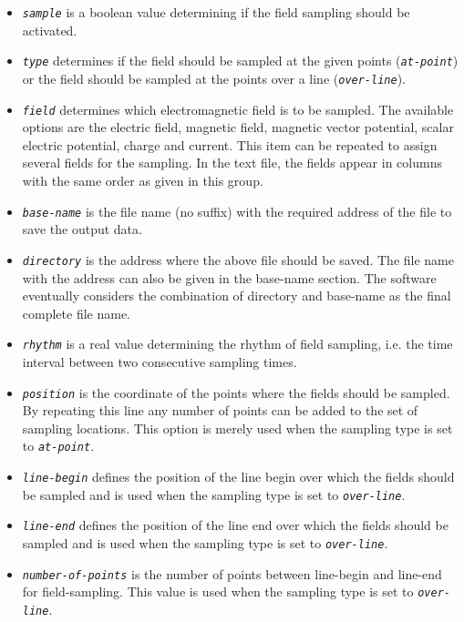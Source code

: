 \begin{enumerate}
%
\begin{itemize}
	\item {\tt \small \em sample} is a boolean value determining if the field sampling should be activated.
	\item {\tt \small \em type} determines if the field should be sampled at the given points ({\tt \small \em at-point}) or the field should be sampled at the points over a line ({\tt \small \em over-line}).
	\item {\tt \small \em field} determines which electromagnetic field is to be sampled. The available options are the electric field, magnetic field, magnetic vector potential, scalar electric potential, charge and current. This item can be repeated to assign several fields for the sampling. In the text file, the fields appear in columns with the same order as given in this group.
	\item {\tt \small \em base-name} is the file name (no suffix) with the required address of the file to save the output data.
	\item {\tt \small \em directory} is the address where the above file should be saved. The file name with the address can also be given in the base-name section. The software eventually considers the combination of directory and base-name as the final complete file name.
	\item {\tt \small \em rhythm} is a real value determining the rhythm of field sampling, i.e. the time interval between two consecutive sampling times.
	\item {\tt \small \em position} is the coordinate of the points where the fields should be sampled. By repeating this line any number of points can be added to the set of sampling locations. This option is merely used when the sampling type is set to {\tt \small \em at-point}.
	\item {\tt \small \em line-begin} defines the position of the line begin over which the fields should be sampled and is used when the sampling type is set to {\tt \small \em over-line}.
	\item {\tt \small \em line-end} defines the position of the line end over which the fields should be sampled and is used when the sampling type is set to {\tt \small \em over-line}.
	\item {\tt \small \em number-of-points} is the number of points between line-begin and line-end for field-sampling. This value is used when the sampling type is set to {\tt \small \em over-line}.
\end{itemize}

\end{enumerate}
